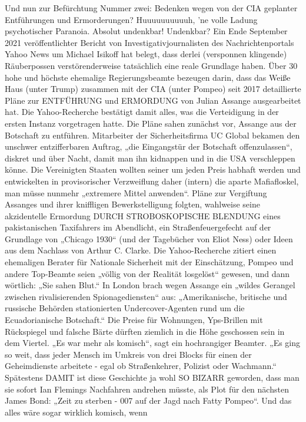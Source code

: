 \begin{multicols}{2}
Und nun zur Befürchtung Nummer zwei: Bedenken wegen von der CIA geplanter Entführungen und Ermorderungen? Huuuuuuuuuuh, ’ne volle Ladung psychotischer Paranoia. Absolut undenkbar! Undenkbar?
Ein Ende September 2021 veröffentlichter Bericht von
Investigativjournalisten des Nachrichtenportals Yahoo
News um Michael Isikoff hat belegt, dass derlei (versponnen klingende) Räuberpossen verstörenderweise
tatsächlich eine reale Grundlage haben. Über 30 hohe
und höchste ehemalige Regierungsbeamte bezeugen
darin, dass das Weiße Haus (unter Trump) zusammen
mit der CIA (unter Pompeo) seit 2017 detaillierte Pläne
zur ENTFÜHRUNG und ERMORDUNG von Julian Assange ausgearbeitet hat. Die Yahoo-Recherche bestätigt
damit alles, was die Verteidigung in der ersten Instanz
vorgetragen hatte.
Die Pläne sahen zunächst vor, Assange aus der Botschaft
zu entführen. Mitarbeiter der Sicherheitsfirma UC Global bekamen den unschwer entzifferbaren Auftrag, „die
Eingangstür der Botschaft offenzulassen“, diskret und
über Nacht, damit man ihn kidnappen und in die USA
verschleppen könne. Die Vereinigten Staaten wollten
seiner um jeden Preis habhaft werden und entwickelten in provisorischer Verzweiflung daher (intern) die
aparte Mafiafloskel, man müsse nunmehr „extremere Mittel anwenden“. Pläne zur Vergiftung Assanges und
ihrer kniffligen Bewerkstelligung folgten, wahlweise
seine akzidentelle Ermordung DURCH STROBOSKOPISCHE BLENDUNG eines pakistanischen Taxifahrers im
Abendlicht, ein Straßenfeuergefecht auf der Grundlage
von „Chicago 1930“ (und der Tagebücher von Eliot Ness)
oder Ideen aus dem Nachlass von Arthur C. Clarke.
Die Yahoo-Recherche zitiert einen ehemaligen Berater
für Nationale Sicherheit mit der Einschätzung, Pompeo
und andere Top-Beamte seien „völlig von der Realität
losgelöst“ gewesen, und dann wörtlich: „Sie sahen Blut.“
In London brach wegen Assange ein „wildes Gerangel
zwischen rivalisierenden Spionagediensten“ aus: „Amerikanische, britische und russische Behörden stationierten Undercover-Agenten rund um die Ecuadorianische
Botschaft.“ Die Preise für Wohnungen, Yps-Brillen mit
Rückspiegel und falsche Bärte dürften ziemlich in die
Höhe geschossen sein in dem Viertel. „Es war mehr als
komisch“, sagt ein hochrangiger Beamter. „Es ging so
weit, dass jeder Mensch im Umkreis von drei Blocks für
einen der Geheimdienste arbeitete - egal ob Straßenkehrer, Polizist oder Wachmann.“
Spätestens DAMIT ist diese Geschichte ja wohl SO BIZARR geworden, dass man sie sofort Ian Flemings Nachfahren andrehen müsste, als Plot für den nächsten James
Bond: „Zeit zu sterben - 007 auf der Jagd nach Fatty Pompeo“. Und das alles wäre sogar wirklich komisch, wenn

\end{multicols}
